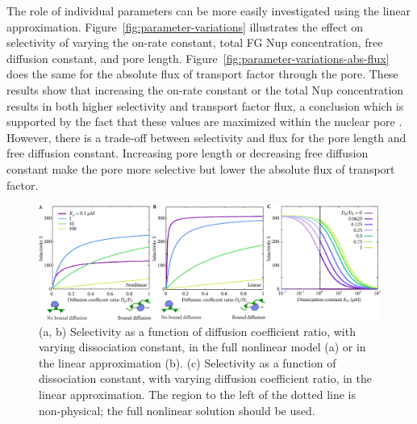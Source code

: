 The role of individual parameters can be more easily investigated using the linear approximation.  Figure~\ref{fig:parameter-variations} illustrates the effect on selectivity of varying the on-rate constant, total FG Nup concentration, free diffusion constant, and pore length.  Figure~\ref{fig:parameter-variations-abs-flux} does the same for the absolute flux of transport factor through the pore.  These results show that increasing the on-rate constant or the total Nup concentration results in both higher selectivity and transport factor flux, a conclusion which is supported by the fact that these values are maximized within the nuclear pore \cite{milles15, hough15}.  However, there is a trade-off between selectivity and flux for the pore length and free diffusion constant.  Increasing pore length or decreasing free diffusion constant make the pore more selective but lower the absolute flux of transport factor.

\begin{figure}
\centering
\includegraphics[width=\linewidth]{figs/ch02/linear-selectivity.pdf}
\caption[Selectivity in the linear approximation.]{(a, b) Selectivity as a function of diffusion coefficient
  ratio, with varying dissociation constant, in the full nonlinear
  model (a) or in the linear approximation (b).  (c) Selectivity as a
  function of dissociation constant, with varying diffusion
  coefficient ratio, in the linear approximation.  The region to the
  left of the dotted line is non-physical; the full nonlinear solution
  should be used.}
\label{fig:linear-selectivity}
\end{figure}

